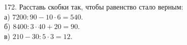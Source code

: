 172. Расставь скобки так, чтобы равенство стало верным:\\
а) $7200:90-10\cdot6=540.$\\
б) $8400:3\cdot40+20=90.$\\
в) $210-30:5\cdot3=12.$\\
